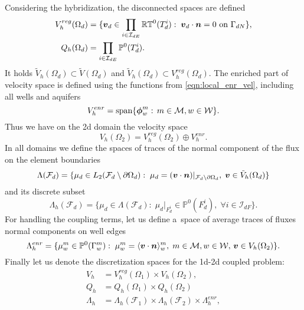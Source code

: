 Considering the hybridization, the disconnected spaces are defined
\begin{align}
    V^{reg}_{h}(\Omega_d) &= \{\mathbf{\boldsymbol{v}}_d \in \prod_{i\in\mathcal{I}_{dE}} \mathbb{RT}^0(T^i_d):\;
        \mathbf{\boldsymbol{v}}_d \cdot \mathbf{\boldsymbol{n}} = 0 \textrm{ on } \Gamma_{dN}\}, \\
    Q_h(\Omega_d) &= \prod_{i\in\mathcal{I}_{dE}} \mathbb{P}^0(T^i_d).
\end{align}
It holds $\tilde V_h(\Omega_d) \subset \tilde V(\Omega_d)$ and $\tilde V_h(\Omega_d) \subset V^{reg}_h(\Omega_d)$.
The enriched part of velocity space is defined using the functions from \eqref{eqn:local_enr_vel},
including all wells and aquifers
\begin{equation}
    V^{enr}_h = \textrm{span}\{\mathbf{\boldsymbol{\phi}}^m_w:\, m\in\mathcal{M}, w\in\mathcal{W}\}.
\end{equation}
Thus we have on the 2d domain the velocity space
\begin{equation}
    V_h(\Omega_2) = V^{reg}_{h}(\Omega_2) \oplus V^{enr}_h.
\end{equation}
In all domains we define the spaces of traces of the normal component of the flux on the element boundaries
\begin{equation}
    \Lambda(\mathcal{F}_d) = \{\mu_d \in L_2(\mathcal{F}_d\setminus\partial\Omega_d):\;
        \mu_d=(\mathbf{\boldsymbol{v}}\cdot \mathbf{\boldsymbol{n}})|_{\mathcal{F}_d\setminus\partial\Omega_d},\; \mathbf{\boldsymbol{v}}\in \tilde V_h(\Omega_d)\}
\end{equation}
and its discrete subset
\begin{equation}
    \Lambda_h(\mathcal{F}_d) = \{\mu_d \in \Lambda(\mathcal{F}_d):\;
        \mu_d|_{F^i_d}\in\mathbb{P}^0(F^i_d),\; \forall i\in\mathcal{I}_{dF}\}.
\end{equation}
For handling the coupling terms, let us define a~space of average traces of fluxes normal components on well edges
\begin{equation} \label{eqn:lambda_w_space_2d}
    \Lambda^{enr}_h = \{\mu^m_w\in \mathbb P^0(\Gamma^m_w):\;
    \mu^m_w=\langle\mathbf{\boldsymbol{v}}\cdot \mathbf{\boldsymbol{n}}\rangle^m_w,\; m\in\mathcal{M}, w\in\mathcal{W},\, \mathbf{\boldsymbol{v}}\in V_h(\Omega_2)\}.
\end{equation}
%
Finally let us denote the discretization spaces for the 1d-2d coupled problem:
\begin{align}
    V_h &= V^{reg}_h(\Omega_1) \times V_h(\Omega_2), \label{eqn:vel_h_space}\\
    Q_h &= Q_h(\Omega_1) \times Q_h(\Omega_2) \label{eqn:press_h_space} \\
    \Lambda_h &= \Lambda_h(\mathcal{F}_1)\times \Lambda_h(\mathcal{F}_2) \times \Lambda^{enr}_h, \label{eqn:lambda_h_space}
\end{align}

